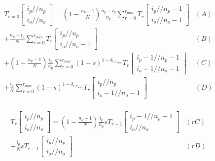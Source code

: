 \documentclass[preview]{standalone}
\newcommand{\Coalc}[4]{\begin{bmatrix}#1 /\!\!/ #2 \\ #3 /\!\!/ #4 \end{bmatrix}}
\begin{document}
\begin{equation*}
  \begin{aligned}
    T_{r=0}\Coalc{i_p}{n_p}{i_o}{n_o}
    = \left(1-\frac{n_p-1}{N}\right) \frac{n_p-i_p}{n_p} \sum_{r=0}^{r_{max}}                              T_{r}\Coalc{i_p  }{n_p-1}{i_o  }{n_o-1} & (A) \\
    +                                \frac{n_p-i_p}{N}   \sum_{r=0}^{r_{max}}                              T_{r}\Coalc{i_p  }{n_p  }{i_o  }{n_o-1} & (B) \\
    + \left(1-\frac{n_p-1}{N}\right) \frac{i_p}{n_p}     \sum_{r=0}^{r_{max}} (1-s)^{1-\delta_{r,r_{max}}} T_{r}\Coalc{i_p-1}{n_p-1}{i_o-1}{n_o-1} & (C) \\
    +                                \frac{i_p}{N}       \sum_{r=0}^{r_{max}} (1-s)^{1-\delta_{r,r_{max}}} T_{r}\Coalc{i_p  }{n_p  }{i_o-1}{n_o-1} & (D) \\
  \end{aligned}
\end{equation*}

\begin{equation*}
  \begin{aligned}
    T_{r}\Coalc{i_p}{n_p}{i_o}{n_o}
    = \left(1-\frac{n_p-1}{N}\right) \frac{i_p}{n_p} s T_{r-1} \Coalc{i_p-1}{n_p-1}{i_o}{n_o}& (rC) \\
    +                                \frac{i_p}{N}   s T_{r-1} \Coalc{i_p  }{n_p  }{i_o}{n_o}& (rD) \\
  \end{aligned}
\end{equation*}
\end{document}
